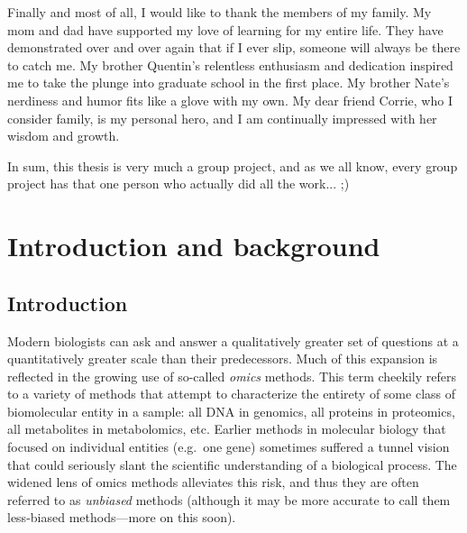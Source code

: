 \documentclass[11pt]{ucthesis}
\begin{document}
\begin{frontmatter}
\begin{acknowledgements}
Finally and most of all, I would like to thank the members of my family. My mom and dad have supported my love of learning for my entire life. They have demonstrated over and over again that if I ever slip, someone will always be there to catch me. My brother Quentin's relentless enthusiasm and dedication inspired me to take the plunge into graduate school in the first place. My brother Nate's nerdiness and humor fits like a glove with my own. My dear friend Corrie, who I consider family, is my personal hero, and I am continually impressed with her wisdom and growth.

In sum, this thesis is very much a group project, and as we all know, every group project has that one person who actually did all the work...  ;)

\end{acknowledgements}

\end{frontmatter}

\part{Introduction and background}

\chapter{Introduction}

\label{chapter:intro}


Modern biologists can ask and answer a qualitatively greater set of questions at a quantitatively greater scale than their predecessors. Much of this expansion is reflected in the growing use of so-called \emph{omics} methods. This term cheekily refers to a variety of methods that attempt to characterize the entirety of some class of biomolecular entity in a sample: all DNA in genomics, all proteins in proteomics, all metabolites in metabolomics, etc. Earlier methods in molecular biology that focused on individual entities (e.g.\ one gene) sometimes suffered a tunnel vision that could seriously slant the scientific understanding of a biological process. The widened lens of omics methods alleviates this risk, and thus they are often referred to as \emph{unbiased} methods (although it may be more accurate to call them less-biased methods---more on this soon).
\end{document}
